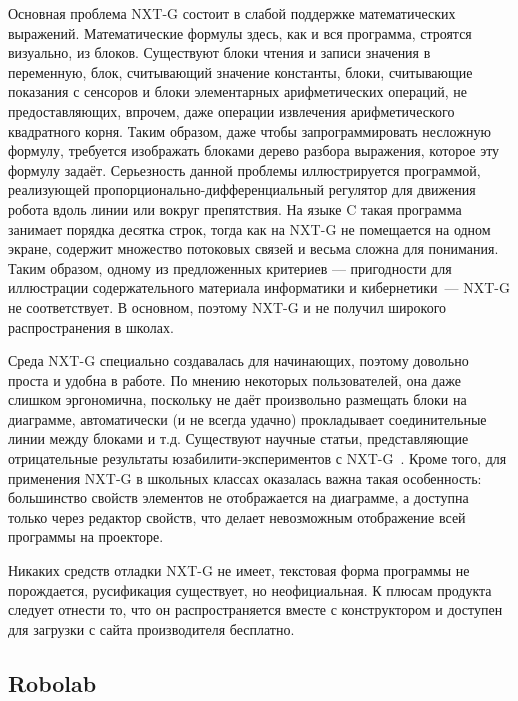 \documentclass[a5paper]{article}
\begin{document}
Основная проблема NXT-G состоит в слабой поддержке математических выражений. Математические формулы 
здесь, как и вся программа, строятся визуально, из блоков. Существуют блоки чтения и записи значения в 
переменную, блок, считывающий значение константы, блоки, считывающие показания с сенсоров и блоки элементарных 
арифметических операций, не предоставляющих, впрочем, даже операции извлечения арифметического квадратного корня. 
Таким образом, даже чтобы запрограммировать несложную формулу, требуется изображать блоками дерево разбора выражения, 
которое эту формулу задаёт. Серьезность данной проблемы иллюстрируется программой, реализующей 
пропорционально-дифференциальный регулятор для движения робота вдоль линии или вокруг препятствия. На языке C 
такая программа занимает порядка десятка строк, тогда как на NXT-G не помещается на одном экране, содержит 
множество потоковых связей и весьма сложна для понимания. Таким образом, одному из предложенных критериев --- 
пригодности для иллюстрации содержательного материала информатики и кибернетики~--- NXT-G не соответствует. 
В основном, поэтому NXT-G и не получил широкого распространения в школах.

Среда NXT-G специально создавалась для начинающих, поэтому довольно проста и удобна в работе. По мнению 
некоторых пользователей, она даже слишком эргономична, поскольку не даёт произвольно размещать блоки на диаграмме, 
автоматически (и не всегда удачно) прокладывает соединительные линии между блоками и т.д. Существуют научные статьи, 
представляющие отрицательные результаты юзабилити-экспериментов с NXT-G~\cite{nguyen2011case}. Кроме того, 
для применения NXT-G в школьных классах оказалась важна такая особенность: большинство свойств 
элементов не отображается на диаграмме, 
а доступна только через редактор свойств, что делает невозможным отображение всей программы на проекторе. 

Никаких средств отладки NXT-G не имеет, текстовая форма программы не порождается, русификация существует, 
но неофициальная. К плюсам продукта следует отнести то, что он распространяется вместе с конструктором и 
доступен для загрузки с сайта производителя бесплатно.

\subsection{Robolab}
\end{document}
